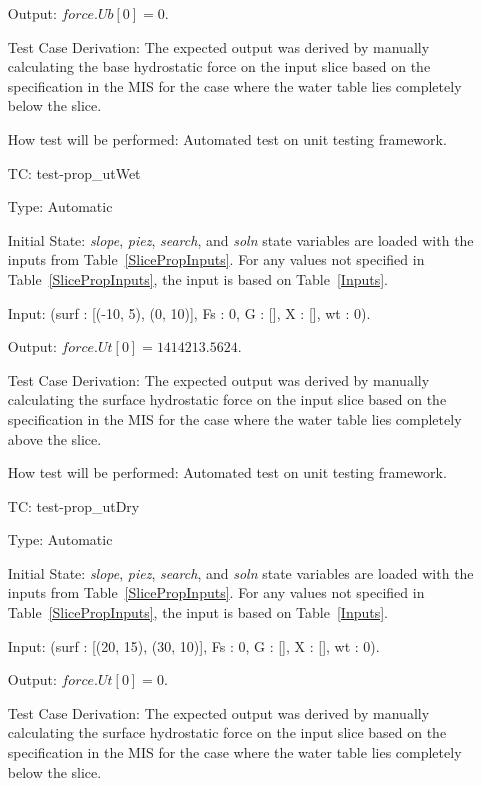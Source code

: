 \documentclass[12pt, titlepage]{article}
\newcounter{utestnum} %
\begin{document}
\begin{enumerate}[label=TC\arabic*:,ref={\arabic*}]
	Output: $\textit{force.Ub}[0] = 0$.
	
	Test Case Derivation: The expected output was derived by manually 
	calculating the base hydrostatic force on the input slice based on the 
	specification in the MIS for the case where the water table lies completely 
	below the slice.
	
	How test will be performed: Automated test on unit testing framework.
	
	\item [TC\refstepcounter{utestnum}\theutestnum: 
	\label{TC_PropertyUtWet}] 
	test-prop\_utWet
	
	Type: Automatic
	
	Initial State: \textit{slope}, \textit{piez}, \textit{search}, and 
	\textit{soln} state variables are loaded with the inputs from 
	Table~\ref{SlicePropInputs}. For any values not specified in 
	Table~\ref{SlicePropInputs}, the input is based on Table~\ref{Inputs}.
	
	Input: (surf : [(-10, 5), (0, 10)], Fs : 0, G : [], X : [], wt : 
	0).
	
	Output: $\textit{force.Ut}[0] = 1414213.5624$.
	
	Test Case Derivation: The expected output was derived by manually 
	calculating the surface hydrostatic force on the input slice based on the 
	specification in the MIS for the case where the water table lies completely 
	above the slice.
	
	How test will be performed: Automated test on unit testing framework.
	
	\item [TC\refstepcounter{utestnum}\theutestnum: 
	\label{TC_PropertyUtDry}] 
	test-prop\_utDry
	
	Type: Automatic
	
	Initial State: \textit{slope}, \textit{piez}, \textit{search}, and 
	\textit{soln} state variables are loaded with the inputs from 
	Table~\ref{SlicePropInputs}. For any values not specified in 
	Table~\ref{SlicePropInputs}, the input is based on Table~\ref{Inputs}.
	
	Input: (surf : [(20, 15), (30, 10)], Fs : 0, G : [], X : [], wt : 
	0).
	
	Output: $\textit{force.Ut}[0] = 0$.
	
	Test Case Derivation: The expected output was derived by manually 
	calculating the surface hydrostatic force on the input slice based on the 
	specification in the MIS for the case where the water table lies completely 
	below the slice.
	

\end{enumerate}
\end{document}
